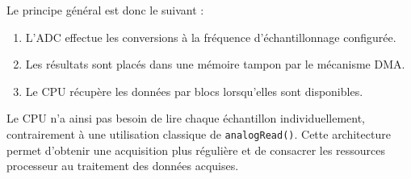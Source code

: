 Le principe général est donc le suivant :

\begin{enumerate}
    \item L'ADC effectue les conversions à la fréquence d'échantillonnage configurée.
    \item Les résultats sont placés dans une mémoire tampon par le mécanisme DMA.
    \item Le CPU récupère les données par blocs lorsqu'elles sont disponibles.
\end{enumerate}

Le CPU n'a ainsi pas besoin de lire chaque échantillon individuellement, contrairement à une utilisation classique de \texttt{analogRead()}. Cette architecture permet d'obtenir une acquisition plus régulière et de consacrer les ressources processeur au traitement des données acquises.